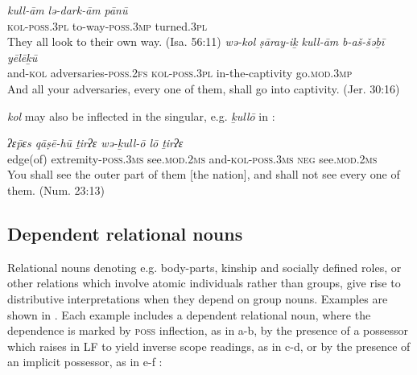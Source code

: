 \documentclass[output=paper]{langsci/langscibook}
\begin{document}
\ea%
    \label{ex:doron:49}
    \ea
    \gll \textit{kull-ām}             \textit{lə-dark-ām}            \textit{pānū}\\
         \textsc{kol-poss.3pl}  to-way-\textsc{poss.3mp}  turned.\textsc{3pl}\\
    \glt They all look to their own way. (Isa. 56:11)
    \ex
    \gll \textit{wə-kol}     \textit{ṣāray-iḵ}                        \textit{kull-ām}            \textit{b-aš-šəḇī}            \textit{yēlēḵū}\\
         and-\textsc{kol} adversaries-\textsc{poss.2fs}   \textsc{kol-poss.3pl}  in-the-captivity  go.\textsc{mod.3mp} \\
    \glt And all your adversaries, every one of them, shall go into captivity.  (Jer. 30:16)
    \z
\z

\textit{kol} may also be inflected in the singular, e.g. \textit{ḵullō} in :

\ea%
    \label{ex:doron:50}
    \gll \textit{ʔɛ\={p}ɛs      qāṣē-hū                      ṯirʔɛ                 wə-ḵull-ō                  lō      ṯirʔɛ}\\
         edge(of) extremity-\textsc{poss.3ms}  see.\textsc{mod.}2\textsc{ms}   and-\textsc{kol}{}-\textsc{poss.}3\textsc{ms}  \textsc{neg}  see.\textsc{mod.}2\textsc{ms}\\
    \glt You shall see the outer part of them [the nation], and shall not see every one of them. (Num. 23:13)
    \z

\subsection{Dependent relational nouns}%

Relational nouns denoting e.g. body-parts, kinship and socially defined roles, or other relations which involve atomic individuals rather than groups, give rise to distributive interpretations when they depend on group nouns. Examples are shown in . Each example includes a dependent relational noun, where the dependence is marked by \textsc{poss} inflection, as in  a-b, by the presence of a possessor which raises in LF to yield inverse scope readings, as in  c-d, or by the presence of an implicit possessor, as in  e-f :
\end{document}
